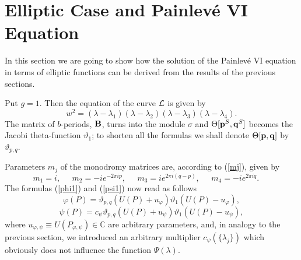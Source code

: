 \documentclass[11pt]{article}
\def\be{\begin{equation}}
\def\ee{\end{equation}}
\def\ben{\begin{displaymath}}
\def\een{\end{displaymath}}
\def\l{\lambda}
\def\th{\vartheta}
\def\Th{\Theta}
\def\phi{\varphi}
\def\B{{\bf B}}
\def\C{\mathbb{C}}
\def\L{{\cal L}}
\def\pb{{\bf p}}
\def\qb{{\bf q}}
\def\0{S}
\begin{document}
\section{Elliptic Case and Painlev\'{e} VI Equation}
\setcounter{equation}{0}

In this section we are going to show how the solution of the Painlev\'{e} VI equation in terms of elliptic functions can be derived from the results of the previous sections.
 
Put $g=1$. Then the equation of the curve $\L$ is given by 
\be
w^2=  (\l-\l_1)(\l-\l_2)(\l-\l_3)(\l-\l_4).
\ee
The matrix of $b$-periods, $\B$, turns into the module $\sigma$ and $\Th[\pb^\0,\qb^\0]$ becomes the Jacobi theta-function $\th_1$; to shorten all the formulas we shall denote $\Th[\pb,\qb]$ by $\th_{p,q}$. 

Parameters $m_j$ of the monodromy matrices are, according to (\ref{mj}), given by
\ben
m_1=i,\;\;\;\;\; m_2= -ie^{-2\pi i p},\;\;\;\;\;
m_3=i e^{2\pi i(q-p)},\;\;\;\;\; m_4= -ie^{2\pi i q}.\;\;\;\;\;
\een
The formulas (\ref{phi1}) and (\ref{psi1}) now read as follows
\be
\phi(P)=\th_{p,q}(U(P)+u_\phi)\th_1(U(P)-u_\phi),
\ee
\be
\psi(P)=c_\psi\th_{p,q}(U(P)+u_\psi)\th_1(U(P)-u_\psi),
\ee
where $u_{\phi,\psi}\equiv U(P_{\phi,\psi})\in\C$ are arbitrary parameters, and,  in analogy to the previous section, we introduced an arbitrary multiplier $c_\psi(\{\l_j\})$ which obviously does not influence the function $\Psi(\l)$. 
\end{document}
